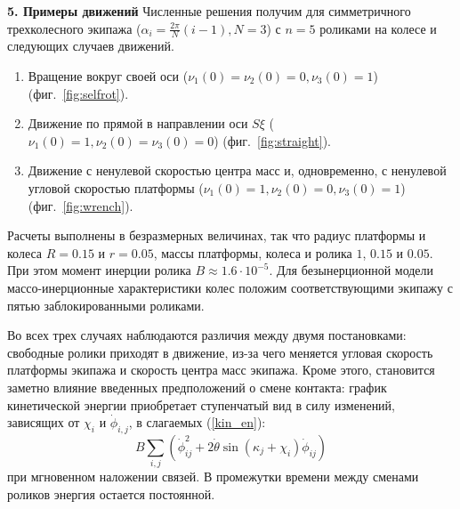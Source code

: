 
{\bf 5. Примеры движений}
Численные решения получим для симметричного трехколесного экипажа ($\alpha_i = \frac{2\pi}{N}(i - 1), N = 3$) с $n = 5$ роликами на колесе и следующих случаев движений.
\begin{enumerate}[wide]
    \item
    \label{sol:selfrot} Вращение вокруг своей оси ($\nu_1(0) = \nu_2(0) = 0, \nu_3(0) = 1$) (фиг.~\ref{fig:selfrot}).
    \item
    \label{sol:straight} Движение по прямой в направлении оси $S\xi$ ($\nu_1(0) = 1, \nu_2(0) = \nu_3(0) = 0$) (фиг.~\ref{fig:straight}).
    \item
    \label{sol:wrench} Движение с ненулевой скоростью центра масс и, одновременно, с ненулевой угловой скоростью платформы ($\nu_1(0) = 1, \nu_2(0) = 0, \nu_3(0) = 1$) (фиг.~\ref{fig:wrench}).

\end{enumerate}


Расчеты выполнены в безразмерных величинах, так что радиус платформы и колеса $R = 0.15$ и $r = 0.05$, массы платформы, колеса и ролика $1$, $0.15$ и $0.05$. При этом момент инерции ролика $B \approx 1.6 \cdot 10^{-5}$. Для безынерционной модели массо-инерционные характеристики колес положим соответствующими экипажу с пятью заблокированными роликами.

Во всех трех случаях наблюдаются различия между двумя постановками: свободные ролики приходят в движение, из-за чего меняется угловая скорость платформы экипажа и скорость центра масс экипажа. Кроме этого, становится заметно влияние введенных предположений о смене контакта: график кинетической энергии приобретает ступенчатый вид в силу изменений, зависящих от $\chi_i$ и $\dot{\phi}_{i,j}$, в слагаемых (\ref{kin_en}): 
\begin{equation}\label{sines_in_kin_en}
    B\sum_{i,j}(\dot{\phi}_{ij}^2 + 2\dot{\theta}\sin(\kappa_j + \chi_i)\dot{\phi}_{ij})
\end{equation}
при мгновенном наложении связей. В промежутки времени между сменами роликов энергия остается постоянной. 

